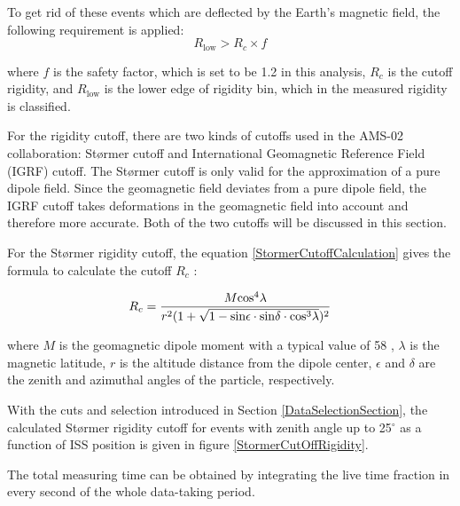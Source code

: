 To get rid of these events which are deflected by the Earth's magnetic field, the following requirement is applied: 
\begin{equation}
R_\mathrm{low} > R_{c} \times f 
\end{equation}

where $f$ is the safety factor, which is set to be 1.2 in this analysis, $R_{c}$ is the cutoff rigidity,  and $R_\mathrm{low}$ is the lower edge of rigidity bin, which in the measured rigidity is classified.  \par


For the rigidity cutoff, there are two kinds of cutoffs used in the AMS-02 collaboration: Størmer cutoff and International Geomagnetic Reference Field (IGRF) cutoff. The Størmer cutoff is only valid for the approximation of a pure dipole field. Since the geomagnetic field deviates from a pure dipole field, the IGRF cutoff takes deformations in the geomagnetic field into account and therefore more accurate. Both of the two cutoffs will be discussed in this section.\par

For the Størmer rigidity cutoff, the equation \ref{StormerCutoffCalculation} gives the formula to calculate the cutoff $R_{c}$ \cite{StormerCutOffCalculation}:  

\begin{equation}
\label{StormerCutoffCalculation}
R_{c} = \frac{M{\rm{cos}}^4\lambda}{r^2(1+\sqrt{1- \rm{sin} \epsilon \cdot \rm{sin} \delta \cdot \rm{cos}^3 \lambda } )^2}
\end{equation}

where $M$ is the geomagnetic dipole moment with a typical value of 58 \cite{StormerCutOffEquation}, $\lambda$ is the magnetic latitude, $r$ is the altitude distance from the dipole center, $\epsilon$ and $\delta$ are the zenith and azimuthal angles of the particle, respectively.

With the cuts and selection introduced in Section \ref{DataSelectionSection}, the calculated Størmer rigidity cutoff for events with zenith angle up to 25$^{\circ}$ as a function of ISS position is given in figure \ref{StormerCutOffRigidity}. 

The total measuring time can be obtained by integrating the live time fraction in every second of the whole data-taking period. 

